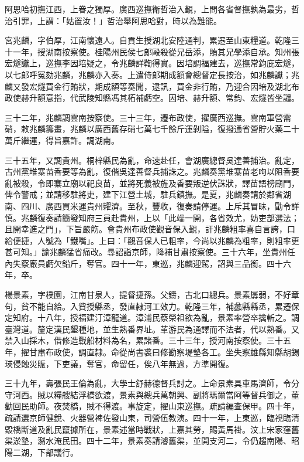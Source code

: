 \begin{pinyinscope}
阿思哈初撫江西，上眷之獨厚。廣西巡撫衛哲治入覲，上問各省督撫孰為最劣，哲治引罪，上謂：「姑置汝！」哲治舉阿思哈對，時以為難能。

宮兆麟，字伯厚，江南懷遠人。自貢生授湖北安陸通判，累遷至山東糧道。乾隆三十一年，授湖南按察使。桂陽州民侯七郎毆殺從兄岳添，賄其兄學添自承。知州張宏燧讞上，巡撫李因培疑之，令兆麟詳鞫得實。因培調福建去，巡撫常鈞庇宏燧，以七郎呼冤劾兆麟，兆麟亦入奏。上遣侍郎期成額會總督定長按治，如兆麟讞；兆麟又發宏燧買金行賄狀，期成額等奏聞，逮訊，買金非行賄，乃迎合因培及湖北布政使赫升額意指，代武陵知縣馮其柘補虧空。因培、赫升額、常鈞、宏燧皆坐譴。

三十二年，兆麟調雲南按察使。三十三年，遷布政使，擢廣西巡撫。雲南軍營需硝，敕兆麟籌畫，兆麟以廣西舊存硝七萬七千餘斤運剝隘，復撥通省營貯火藥二十萬斤繼運，得旨嘉許。調湖南。

三十五年，又調貴州。桐梓縣民為亂，命速赴任，會湖廣總督吳達善捕治。亂定，古州黨堆寨苗香要等為亂，復偕吳達善督兵捕誅之。兆麟奏黨堆寨苗老呴以阻香要亂被殺，令即寨立廟以祀良苗，並將死義被旌及香要叛逆伏誅狀，譯苗語榜廟門，俾令警戒；並請移駐將吏，建下江營土城，駐兵鎮撫。是夏，兆麟奏請於鄰省湖南、四川、廣西買米運貴州糶濟。至秋，豐收，復奏請停運。上斥其冒昧，勖令詳慎。兆麟復奏請簡發知府三員赴貴州，上以「此端一開，各省效尤，妨吏部選法；且開幸進之門」，下旨嚴飭。會貴州布政使觀音保入覲，訐兆麟粗率喜自言誇，口給便捷，人號為「鐵嘴」。上曰：「觀音保人已粗率，今尚以兆麟為粗率，則粗率更甚可知。」諭兆麟猛省痛改。尋詔詣京師，降補甘肅按察使。三十六年，坐貴州任內失察廠員虧欠鉛斤，奪官。四十一年，東巡，兆麟迎駕，詔與三品銜。四十六年，卒。

楊景素，字樸園，江南甘泉人，提督捷孫。父鑄，古北口總兵。景素孱弱，不好章句，貧不能自給。入貲授縣丞，發直隸河工效力。乾隆三年，補蠡縣縣丞，累遷保定知府。十八年，授福建汀漳龍道。漳浦民蔡榮祖欲為亂，景素率營卒擒斬之。調臺灣道。釐定漢民墾種地，並生熟番界址。革游民為通譯而不法者，代以熟番。又禁入山採木，借修造戰船材料為名，累諸番。三十三年，授河南按察使。三十五年，擢甘肅布政使，調直隸。命從尚書裘曰修勘察堤墊各工。坐失察雄縣知縣胡錫瑛侵蝕災賑，下吏議，奪官，命留任，俟八年無過，方準開復。

三十九年，壽張民王倫為亂，大學士舒赫德督兵討之。上命景素具車馬濟師，令分守河西。賊以糧艘結浮橋欲渡，景素與總兵萬朝興、副將瑪爾當阿等督兵御之，董勸回民助師。夜焚橋，賊不得渡。事旋定，擢山東巡撫。疏請編查保甲。四十年，疏請選京師健銳、火器營裨佐發山東，司營伍教演。四十一年，上東巡，臨視臨清毀橋斷道及亂民竄據所在，景素述當時戰狀，上嘉其勞，賜黃馬褂。汶上宋家窪舊渠淤墊，瀦水淹民田。四十二年，景素奏請濬舊渠，並開支河二，令仍趨南陽、昭陽二湖，下部議行。


\end{pinyinscope}
